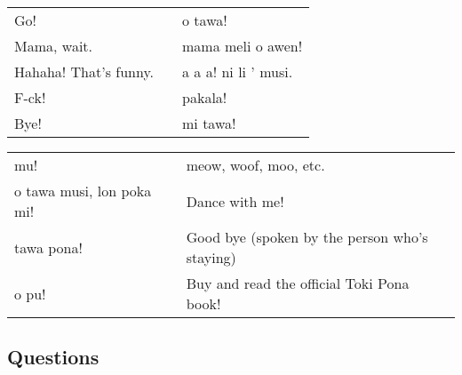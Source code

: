\begin{supertabular}{p{5,5cm}|ll}
    Go!                   &  & o tawa!              \\ %
    Mama, wait.           &  & mama meli o awen!    \\ %
    Hahaha! That's funny. &  & a a a! ni li ' musi. \\ %
    F-ck!                 &  & pakala!              \\ %
    Bye!                  &  & mi tawa!             \\ %
\end{supertabular}

\begin{supertabular}{p{5,5cm}|ll}
    mu!                       &  & meow, woof, moo, etc.                         \\
    o tawa musi, lon poka mi! &  & Dance with me!                                \\
    tawa pona!                &  & Good bye (spoken by the person who's staying) \\
    o pu!                     &  & Buy and read the official Toki Pona book!     \\
\end{supertabular}

\newpage
%
\subsection*{Questions}
\label{'questions_using_seme'}
%

